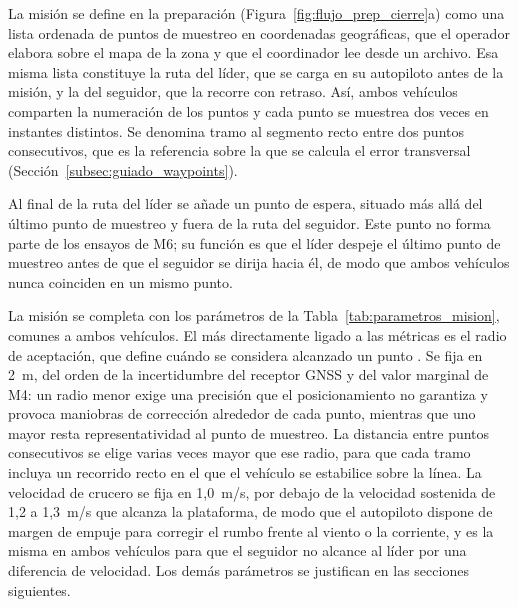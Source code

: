 La misión se define en la preparación (Figura~\ref{fig:flujo_prep_cierre}a) como una lista ordenada de puntos de 
muestreo en coordenadas geográficas, que el operador elabora sobre el mapa de la zona y que el coordinador lee 
desde un archivo. Esa misma lista constituye la ruta del líder, que se carga en su autopiloto antes de la misión, y la del 
seguidor, que la recorre con retraso. Así, ambos vehículos comparten la numeración de los puntos y cada punto 
se muestrea dos veces en instantes distintos. Se denomina tramo al segmento recto entre dos puntos consecutivos, 
que es la referencia sobre la que se calcula el error transversal (Sección~\ref{subsec:guiado_waypoints}). 

Al final de la ruta del líder se añade un punto de espera, situado más allá del último punto de muestreo y fuera 
de la ruta del seguidor. Este punto no forma parte de los ensayos de M6; su función es que el líder despeje el 
último punto de muestreo antes de que el seguidor se dirija hacia él, de modo que ambos vehículos nunca coinciden 
en un mismo punto.

La misión se completa con los parámetros de la Tabla~\ref{tab:parametros_mision}, comunes a ambos vehículos. El 
más directamente ligado a las métricas es el radio de aceptación, que define cuándo se considera alcanzado un 
punto \cite{jin2025}. Se fija en 2~m, del orden de la incertidumbre del receptor GNSS \cite{Cite29} y del 
valor marginal de M4: un radio menor exige una precisión que el posicionamiento no garantiza y provoca maniobras 
de corrección alrededor de cada punto, mientras que uno mayor resta representatividad al punto de muestreo. La 
distancia entre puntos consecutivos se elige varias veces mayor que ese radio, para que cada tramo incluya un 
recorrido recto en el que el vehículo se estabilice sobre la línea. La velocidad de crucero se fija en 1,0~m/s, 
por debajo de la velocidad sostenida de 1,2 a 1,3~m/s que alcanza la plataforma, de modo que el autopiloto 
dispone de margen de empuje para corregir el rumbo frente al viento o la corriente, y es la misma en ambos 
vehículos para que el seguidor no alcance al líder por una diferencia de velocidad. Los demás parámetros se 
justifican en las secciones siguientes.

